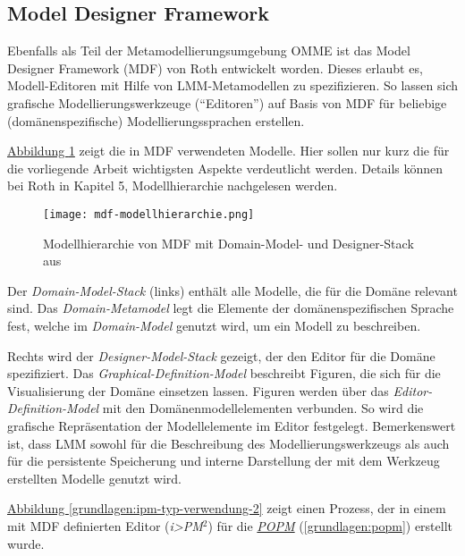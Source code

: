\documentclass[a4paper,10pt]{sphinxmanual}
\begin{document}
\subsection{Model Designer Framework}
\label{grundlagen:model-designer-framework}\label{grundlagen:mdf}
Ebenfalls als Teil der Metamodellierungsumgebung OMME ist das Model Designer Framework (MDF) von Roth \cite{roth_konzeption_2011} entwickelt worden.
Dieses erlaubt es, Modell-Editoren mit Hilfe von LMM-Metamodellen zu spezifizieren.
So lassen sich grafische Modellierungswerkzeuge ("`Editoren"') auf Basis von MDF für beliebige (domänenspezifische) Modellierungssprachen erstellen.

\hyperref[grundlagen:mdf-modellhierarchie]{Abbildung  \ref*{grundlagen:mdf-modellhierarchie}} zeigt die in MDF verwendeten Modelle. Hier sollen nur kurz die für die vorliegende Arbeit wichtigsten Aspekte verdeutlicht werden.
Details können bei Roth in Kapitel 5, Modellhierarchie nachgelesen werden.
\begin{figure}[htbp]
\centering
\capstart

\texttt{[image: mdf-modellhierarchie.png]}
\caption{Modellhierarchie von MDF mit Domain-Model- und Designer-Stack aus \cite{roth_konzeption_2011}}\label{grundlagen:mdf-modellhierarchie}\end{figure}

Der \emph{Domain-Model-Stack} (links) enthält alle Modelle, die für die Domäne relevant sind.
Das \emph{Domain-Metamodel} legt die Elemente der domänenspezifischen Sprache fest, welche im \emph{Domain-Model} genutzt wird, um ein Modell zu beschreiben.

Rechts wird der \emph{Designer-Model-Stack} gezeigt, der den Editor für die Domäne spezifiziert.
Das \emph{Graphical-Definition-Model} beschreibt Figuren, die sich für die Visualisierung der Domäne einsetzen lassen.
Figuren werden über das \emph{Editor-Definition-Model} mit den Domänenmodellelementen verbunden. So wird die grafische Repräsentation der Modellelemente im Editor festgelegt.
Bemerkenswert ist, dass LMM sowohl für die Beschreibung des Modellierungswerkzeugs als auch für die persistente Speicherung und interne Darstellung der mit dem Werkzeug erstellten Modelle genutzt wird.

\hyperref[grundlagen:ipm-typ-verwendung-2]{Abbildung  \ref*{grundlagen:ipm-typ-verwendung-2}} zeigt einen Prozess, der in einem mit MDF definierten Editor (\emph{i\textgreater{}PM}$^{\text{2}}$) für die {\hyperref[grundlagen:popm]{\emph{POPM}}} (\autoref*{grundlagen:popm}) erstellt wurde.
\end{document}
